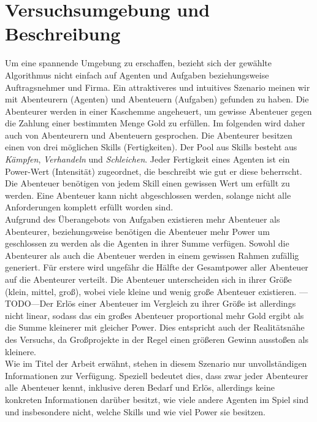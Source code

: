 \documentclass[fleqn,10pt]{SelfArx} %
\begin{document}

\section{Versuchsumgebung und Beschreibung}
\label{sec:Umgebung}

Um eine spannende Umgebung zu erschaffen, bezieht sich der gewählte Algorithmus nicht einfach auf Agenten und Aufgaben beziehungsweise Auftragsnehmer und Firma. Ein attraktiveres und intuitives Szenario meinen wir mit Abenteurern (Agenten) und Abenteuern (Aufgaben) gefunden zu haben. Die Abenteurer werden in einer Kaschemme angeheuert, um gewisse Abenteuer gegen die Zahlung einer bestimmten Menge Gold zu erfüllen. Im folgenden wird daher auch von Abenteurern und Abenteuern gesprochen. Die Abenteurer besitzen einen von drei möglichen Skills (Fertigkeiten). Der Pool aus Skills besteht aus \textit{Kämpfen}, \textit{Verhandeln} und \textit{Schleichen}. Jeder Fertigkeit eines Agenten ist ein Power-Wert (Intensität) zugeordnet, die beschreibt wie gut er diese beherrscht. Die Abenteuer benötigen von jedem Skill einen gewissen Wert um erfüllt zu werden. Eine Abenteuer kann nicht abgeschlossen werden, solange nicht alle Anforderungen komplett erfüllt worden sind.\\
Aufgrund des Überangebots von Aufgaben existieren mehr Abenteuer als Abenteurer, beziehungsweise benötigen die Abenteuer mehr Power um geschlossen zu werden als die Agenten in ihrer Summe verfügen. Sowohl die Abenteurer als auch die Abenteuer werden in einem gewissen Rahmen zufällig generiert. Für erstere wird ungefähr die Hälfte der Gesamtpower aller Abenteuer auf die Abenteurer verteilt. Die Abenteuer unterscheiden sich in ihrer Größe (klein, mittel, groß), wobei viele kleine und wenig große Abenteuer existieren. ---TODO---Der Erlös einer Abenteuer im Vergleich zu ihrer Größe ist allerdings nicht linear, sodass das ein großes Abenteuer proportional mehr Gold ergibt als die Summe kleinerer mit gleicher Power. Dies entspricht auch der Realitätsnähe des Versuchs, da Großprojekte in der Regel einen größeren Gewinn ausstoßen als kleinere.\\
Wie im Titel der Arbeit erwähnt, stehen in diesem Szenario nur unvollständigen Informationen zur Verfügung. Speziell bedeutet dies, dass zwar jeder Abenteurer alle Abenteuer kennt, inklusive deren Bedarf und Erlös, allerdings keine konkreten Informationen darüber besitzt, wie viele andere Agenten im Spiel sind und insbesondere nicht, welche Skills und wie viel Power sie besitzen.\\ 
\end{document}
